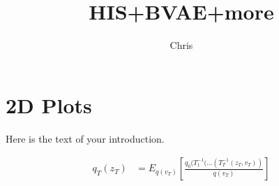 \documentclass{article}
\begin{document}
\title{HIS+BVAE+more}

\author{Chris}

\maketitle


\section{2D Plots}
Here is the text of your introduction.

\begin{align}
    q_{T}(z_{T}) &= E_{q(v_T)} \left[ \frac {q_{0}(T_{1}^{-1}(...(T_{T}^{-1}(z_{T},v_{T}))} { q(v_{T})}  \right ]
\end{align}
\end{document}

